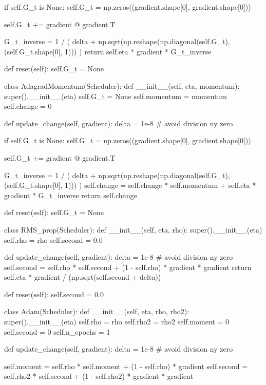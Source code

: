 \documentclass[%
oneside,                 %
final,                   %
10pt]{article}
\begin{document}
        if self.G_t is None:
            self.G_t = np.zeros((gradient.shape[0], gradient.shape[0]))

        self.G_t += gradient @ gradient.T

        G_t_inverse = 1 / (
            delta + np.sqrt(np.reshape(np.diagonal(self.G_t), (self.G_t.shape[0], 1)))
        )
        return self.eta * gradient * G_t_inverse

    def reset(self):
        self.G_t = None


class AdagradMomentum(Scheduler):
    def __init__(self, eta, momentum):
        super().__init__(eta)
        self.G_t = None
        self.momentum = momentum
        self.change = 0

    def update_change(self, gradient):
        delta = 1e-8  # avoid division ny zero

        if self.G_t is None:
            self.G_t = np.zeros((gradient.shape[0], gradient.shape[0]))

        self.G_t += gradient @ gradient.T

        G_t_inverse = 1 / (
            delta + np.sqrt(np.reshape(np.diagonal(self.G_t), (self.G_t.shape[0], 1)))
        )
        self.change = self.change * self.momentum + self.eta * gradient * G_t_inverse
        return self.change

    def reset(self):
        self.G_t = None


class RMS_prop(Scheduler):
    def __init__(self, eta, rho):
        super().__init__(eta)
        self.rho = rho
        self.second = 0.0

    def update_change(self, gradient):
        delta = 1e-8  # avoid division ny zero
        self.second = self.rho * self.second + (1 - self.rho) * gradient * gradient
        return self.eta * gradient / (np.sqrt(self.second + delta))

    def reset(self):
        self.second = 0.0


class Adam(Scheduler):
    def __init__(self, eta, rho, rho2):
        super().__init__(eta)
        self.rho = rho
        self.rho2 = rho2
        self.moment = 0
        self.second = 0
        self.n_epochs = 1

    def update_change(self, gradient):
        delta = 1e-8  # avoid division ny zero

        self.moment = self.rho * self.moment + (1 - self.rho) * gradient
        self.second = self.rho2 * self.second + (1 - self.rho2) * gradient * gradient
\end{document}
